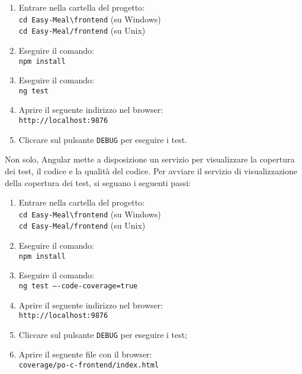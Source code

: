 \begin{enumerate}
	\item Entrare nella cartella del progetto: \\
		\texttt{cd Easy-Meal\textbackslash frontend} (su Windows) \\
		\texttt{cd Easy-Meal/frontend} (su Unix)

	\item Eseguire il comando: \\
		\texttt{npm install}

	\item Eseguire il comando: \\
		\texttt{ng test}

	\item Aprire il seguente indirizzo nel browser: \\
		\texttt{http://localhost:9876}

	\item Cliccare sul pulsante \texttt{DEBUG} per eseguire i test.
\end{enumerate}

Non solo, Angular mette a disposizione un servizio per visualizzare la copertura
dei test, il codice e la qualità del codice. Per avviare il servizio di
visualizzazione della copertura dei test, si seguano i seguenti passi:
\begin{enumerate}
	\item Entrare nella cartella del progetto: \\
		\texttt{cd Easy-Meal\textbackslash frontend} (su Windows) \\
		\texttt{cd Easy-Meal/frontend} (su Unix)

	\item Eseguire il comando: \\
		\texttt{npm install}

	\item Eseguire il comando: \\
		\texttt{ng test ----code-coverage=true}

	\item Aprire il seguente indirizzo nel browser: \\
		\texttt{http://localhost:9876}

	\item Cliccare sul pulsante \texttt{DEBUG} per eseguire i test;\\

	\item Aprire il seguente file con il browser: \\
		\texttt{coverage/po-c-frontend/index.html}
\end{enumerate}


